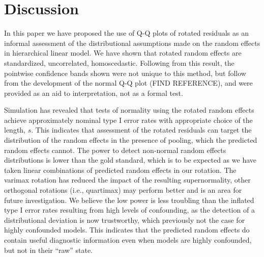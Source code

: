 \documentclass[12pt]{article} %
\begin{document}

\section{Discussion}\label{sec:discussion}

In this paper we have proposed the use of Q-Q plots of rotated residuals as an informal assessment of the distributional assumptions made on the random effects in hierarchical linear model. We have shown that rotated random effects are standardized, uncorrelated, homoscedastic. Following from this result, the pointwise confidence bands shown were not unique to this method, but follow from the development of the normal Q-Q plot (FIND REFERENCE), and were provided as an aid to interpretation, not as a formal test.

Simulation has revealed that tests of normality using the rotated random effects achieve approximately nominal type I error rates with appropriate choice of the length, $s$. This indicates that assessment of the rotated residuals can target the distribution of the random effects in the presence of pooling, which the predicted random effects cannot. The power to detect non-normal random effects distributions is lower than the gold standard, which is to be expected as we have taken linear combinations of predicted random effects in our rotation. The varimax rotation has reduced the impact of the resulting supernormality, other orthogonal rotations (i.e., quartimax) may perform better and is an area for future investigation. We believe the low power is less troubling than the inflated type I error rates resulting from high levels of confounding, as the detection of a distributional deviation is now trustworthy, which previously not the case for highly confounded models. This indicates that the predicted random effects do contain useful diagnostic information even when models are highly confounded, but not in their ``raw'' state.
 
\end{document}
